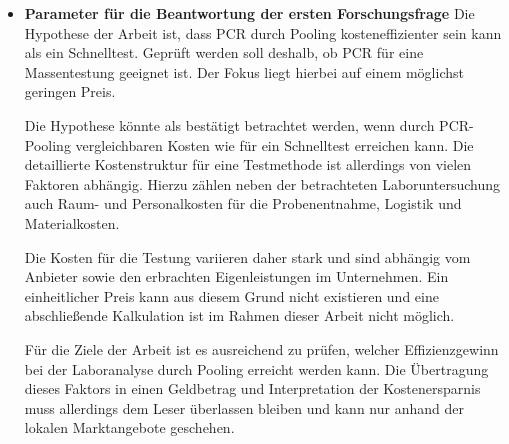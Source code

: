 \begin{itemize}
	\item\textbf{Parameter für die Beantwortung der ersten Forschungsfrage}\newline
	Die Hypothese der Arbeit ist, dass PCR durch Pooling kosteneffizienter sein kann als ein Schnelltest.
	Geprüft werden soll deshalb, ob PCR für eine Massentestung geeignet ist.
	Der Fokus liegt hierbei auf einem möglichst geringen Preis.
	
	Die Hypothese könnte als bestätigt betrachtet werden, wenn durch PCR-Pooling vergleichbaren Kosten wie für ein Schnelltest erreichen kann.
	Die detaillierte Kostenstruktur für eine Testmethode ist allerdings von vielen Faktoren abhängig.
	Hierzu zählen neben der betrachteten Laboruntersuchung auch Raum- und Personalkosten für die Probenentnahme, Logistik und Materialkosten.
	
	Die Kosten für die Testung variieren daher stark und sind abhängig vom Anbieter sowie den erbrachten Eigenleistungen im Unternehmen.
	Ein einheitlicher Preis kann aus diesem Grund nicht existieren und eine abschließende Kalkulation ist im Rahmen dieser Arbeit nicht möglich.
	
	Für die Ziele der Arbeit ist es  ausreichend zu prüfen, welcher Effizienzgewinn bei der Laboranalyse durch Pooling erreicht werden kann.
	Die Übertragung dieses Faktors in einen Geldbetrag und Interpretation der Kostenersparnis muss allerdings dem Leser überlassen bleiben und kann nur anhand der lokalen Marktangebote geschehen.
		

\end{itemize}
